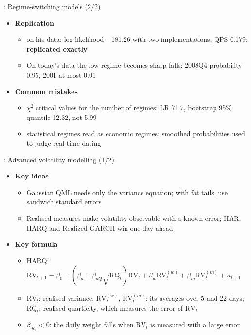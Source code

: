 \begin{frame}{: Regime-switching models (2/2)}
\itemsize{\small}
\begin{itemize}
    \item \textbf{Replication}
    \begin{itemize}
        \item {} on his data: log-likelihood \ensuremath{-}181.26 with two implementations, QPS 0.179: \textbf{replicated exactly}
        \item On today's data the low regime becomes sharp falls: 2008Q4 probability 0.95, 2001 at most 0.01
    \end{itemize}
    \item \textbf{Common mistakes}
    \begin{itemize}
        \item $\chi^2$ critical values for the number of regimes: LR 71.7, bootstrap 95\% quantile 12.32, not 5.99
        \item statistical regimes read as economic regimes; smoothed probabilities used to judge real-time dating
    \end{itemize}
\end{itemize}
\end{frame}

\begin{frame}{: Advanced volatility modelling (1/2)}
\itemsize{\footnotesize}
\begin{itemize}
    \item \textbf{Key ideas}
    \begin{itemize}
        \item Gaussian QML needs only the variance equation; with fat tails, use sandwich standard errors
        \item Realised measures make volatility observable with a known error; HAR, HARQ and Realized GARCH win one day ahead
    \end{itemize}
    \item \textbf{Key formula}
    \begin{itemize}
        \item HARQ: $\mathrm{RV}_{t+1} = \beta_0 + (\beta_d + \beta_{dQ}\sqrt{\mathrm{RQ}_t})\mathrm{RV}_t + \beta_w\mathrm{RV}^{(w)}_t + \beta_m\mathrm{RV}^{(m)}_t + u_{t+1}$
        \item $\mathrm{RV}_t$: realised variance; $\mathrm{RV}^{(w)}_t$, $\mathrm{RV}^{(m)}_t$: its averages over 5 and 22 days; $\mathrm{RQ}_t$: realised quarticity, which measures the error of $\mathrm{RV}_t$
        \item $\beta_{dQ} < 0$: the daily weight falls when $\mathrm{RV}_t$ is measured with a large error
    \end{itemize}
\end{itemize}
\end{frame}

